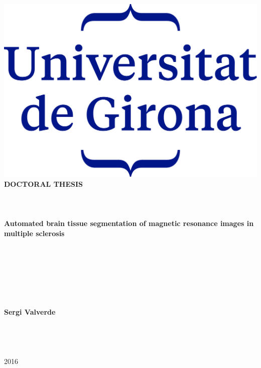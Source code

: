 \hspace{-1.25cm}
\parbox[c]{15cm}{
  \centering
  \includegraphics[scale = 1]{./figures/logo-udg.png}\\
  \vspace{2cm}
  {\textbf{DOCTORAL THESIS}}\\
  \quad \\
  \quad \\ ~\\
  {
    \LARGE \textbf{Automated brain tissue segmentation of magnetic resonance images in multiple sclerosis}
  }
  \quad \\
  \quad \\
  \quad \\
  \quad \\
  \quad \\
  \quad \\
  \quad \\
  \quad \\
  \textbf{Sergi Valverde}\\
  \quad \\
  \quad \\
  \quad \\
  \quad \\
  2016\\
  \quad \\
  \quad \\
}
\newpage
~\\

